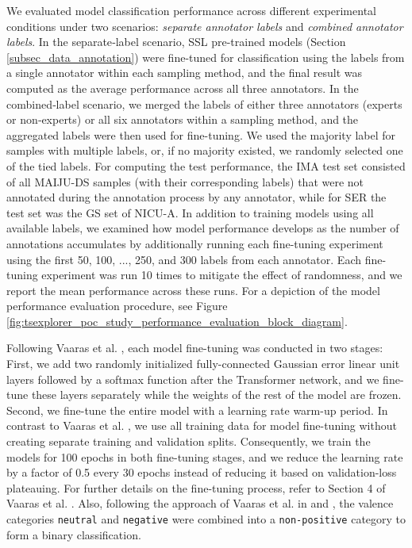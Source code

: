 \documentclass[a4paper,fleqn]{cas-dc}
\begin{document}
We evaluated model classification performance across different experimental conditions under two scenarios: \textit{separate annotator labels} and \textit{combined annotator labels}. In the separate‑label scenario, SSL pre-trained models (Section \ref{subsec_data_annotation}) were fine-tuned for classification using the labels from a single annotator within each sampling method, and the final result was computed as the average performance across all three annotators. In the combined‑label scenario, we merged the labels of either three annotators (experts or non‑experts) or all six annotators within a sampling method, and the aggregated labels were then used for fine-tuning. We used the majority label for samples with multiple labels, or, if no majority existed, we randomly selected one of the tied labels. For computing the test performance, the IMA test set consisted of all MAIJU-DS samples (with their corresponding labels) that were not annotated during the annotation process by any annotator, while for SER the test set was the GS set of NICU-A. In addition to training models using all available labels, we examined how model performance develops as the number of annotations accumulates by additionally running each fine-tuning experiment using the first 50, 100, ..., 250, and 300 labels from each annotator. Each fine-tuning experiment was run 10 times to mitigate the effect of randomness, and we report the mean performance across these runs. For a depiction of the model performance evaluation procedure, see Figure \ref{fig:tsexplorer_poc_study_performance_evaluation_block_diagram}.

Following Vaaras et al. \cite{pfml}, each model fine-tuning was conducted in two stages: First, we add two randomly initialized fully-connected Gaussian error linear unit layers followed by a softmax function after the Transformer network, and we fine-tune these layers separately while the weights of the rest of the model are frozen. Second, we fine-tune the entire model with a learning rate warm-up period. In contrast to Vaaras et al. \cite{pfml}, we use all training data for model fine-tuning without creating separate training and validation splits. Consequently, we train the models for 100 epochs in both fine-tuning stages, and we reduce the learning rate by a factor of 0.5 every 30 epochs instead of reducing it based on validation-loss plateauing. For further details on the fine-tuning process, refer to Section 4 of Vaaras et al. \cite{pfml}. Also, following the approach of Vaaras et al. in \cite{nicu_a_speechcomm} and \cite{pfml}, the valence categories \texttt{neutral} and \texttt{negative} were combined into a \texttt{non-positive} category to form a binary classification.
\end{document}
